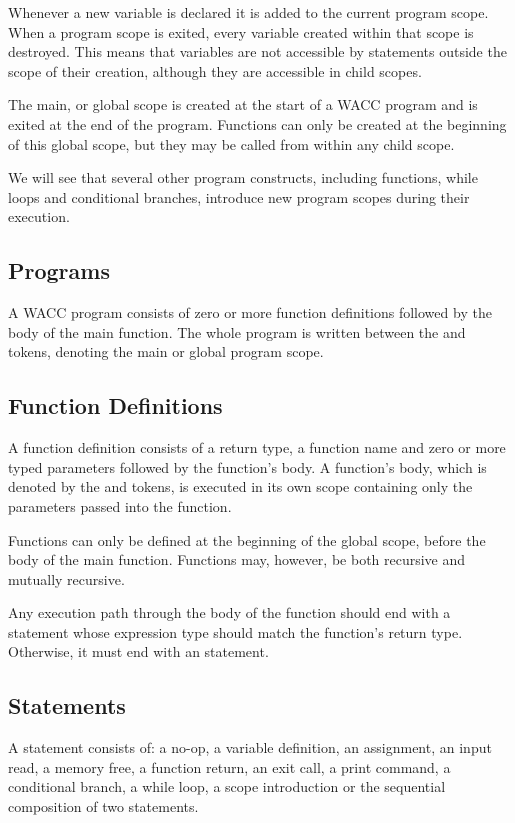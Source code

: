 \documentclass[a4paper]{article}
\theoremstyle{definition}
\begin{document}
Whenever a new variable is declared it is added to the current program scope.
When a program scope is exited, every variable created within that scope is destroyed.
This means that variables are not accessible by statements outside the scope of their creation,
although they are accessible in child scopes.

The main, or global scope is created at the start of a WACC program and is exited at the end of the program.
Functions can only be created at the beginning of this global scope, but they may be called from within any child scope.

We will see that several other program constructs, including functions, while loops and conditional branches, 
introduce new program scopes during their execution.

\subsection{Programs}
A WACC program  consists of zero or more function definitions followed by the body of the main function. 
The whole program is written between the  and  tokens, denoting the main or global program scope.

\subsection{Function Definitions}
A function definition  consists of a return type, a function name 
and zero or more typed parameters followed by the function's body.
A function's body, which is denoted by the  and  tokens, is executed in its own scope 
containing only the parameters passed into the function.

Functions can only be defined at the beginning of the global scope, before the body of the main function.
Functions may, however, be both recursive and mutually recursive.

Any execution path through the body of the function should end with a  statement 
whose expression type should match the function's return type. Otherwise, it must end with an  statement.

\subsection{Statements}
A statement  consists of: 
a no-op,
a variable definition,
an assignment,
an input read,
a memory free,
a function return,
an exit call,
a print command,
a conditional branch,
a while loop,
a scope introduction
or the sequential composition of two statements.
\end{document}
